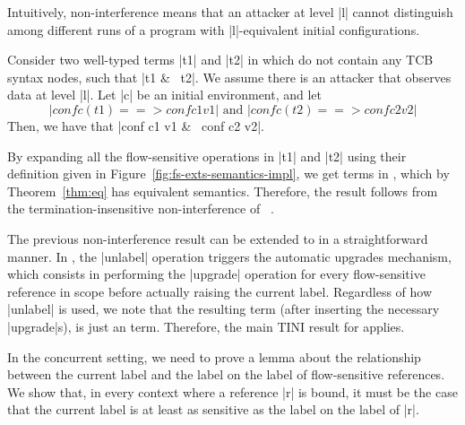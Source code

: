 Intuitively, non-interference means that an attacker at level |l|
cannot distinguish among different runs of a program with
|l|-equivalent initial configurations.

\begin{theorem}
  Consider two well-typed terms |t1| and |t2| in \liofs{} which do not
  contain any TCB syntax nodes, such that |t1 &~ t2|. We assume there
  is an attacker that observes data at level |l|. Let |c| be an
  initial environment, and let
\[
    |conf c (t1) ==> conf c1 v1|\mbox{ and }
    |conf c (t2) ==> conf c2 v2|
\]
  Then, we have that |conf c1 v1 &~ conf c2 v2|.
\end{theorem}

\begin{proofsketch}
  By expanding all the flow-sensitive operations in |t1| and |t2| using their
  definition given in Figure~\ref{fig:fs-exts-semantics-impl}, we get
  terms in \lio{}, which by Theorem~\ref{thm:eq} has equivalent
  semantics. Therefore, the result follows from the
  termination-insensitive non-interference of \lio{}~\citep{stefan:lio}.
\end{proofsketch}

\begin{corollary}
  The previous non-interference result can be extended to \lioafs{} in
  a straightforward manner. In \lioafs{}, the |unlabel| operation
  triggers the automatic upgrades mechanism, which consists in
  performing the |upgrade| operation for every flow-sensitive
  reference in scope before actually raising the current label.
  Regardless of how |unlabel| is used, we note that the resulting term
  (after inserting the necessary |upgrade|s), is just an \liofs{}
  term. Therefore, the main TINI result for \liofs{} applies.


\end{corollary}

In the concurrent setting, we need to prove a lemma about the
relationship between the current label and the label on the label of
flow-sensitive references. We show that, in every context where a
reference |r| is bound, it must be the case that the current label is
at least as sensitive as the label on the label of |r|.

